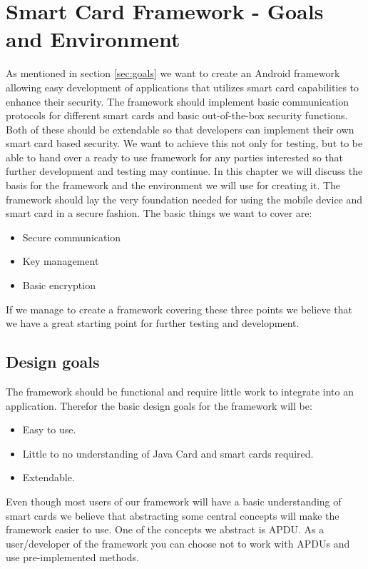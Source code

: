 \chapter{Smart Card Framework - Goals and Environment}
As mentioned in section \ref{sec:goals} we want to create an Android framework allowing easy development of applications that utilizes smart card capabilities to enhance their security. The framework should implement basic communication protocols for different smart cards and basic out-of-the-box security functions. Both of these should be extendable so that developers can implement their own smart card based security. We want to achieve this not only for testing, but to be able to hand over a ready to use framework for any parties interested so that further development and testing may continue. In this chapter we will discuss the basis for the framework and the environment we will use for creating it.
The framework should lay the very foundation needed for using the mobile device and smart card in a secure fashion. The basic things we want to cover are:
\begin{itemize}
    \item Secure communication
    \item Key management
    \item Basic encryption
\end{itemize}
If we manage to create a framework covering these three points we believe that we have a great starting point for further testing and development.

\section{Design goals}
\label{sec:designAndroidGoals}
The framework should be functional and require little work to integrate into an application. Therefor the basic design goals for the framework will be:
\begin{itemize}
    \item Easy to use.
    \item Little to no understanding of Java Card and smart cards required.
    \item Extendable.
\end{itemize}

Even though most users of our framework will have a basic understanding of smart cards we believe that abstracting some central concepts will make the framework easier to use. One of the concepts we abstract is APDU. As a user/developer of the framework you can choose not to work with APDUs and use pre-implemented methods.

